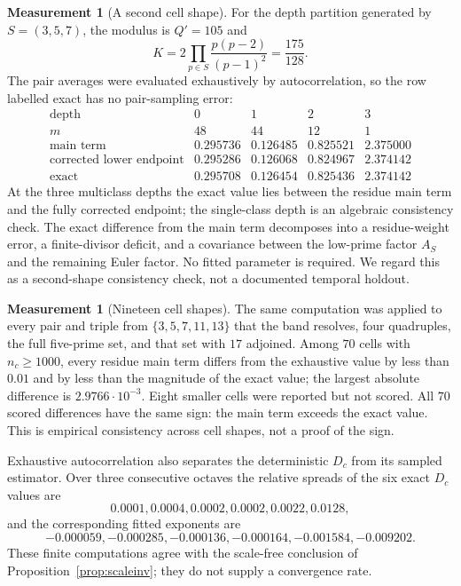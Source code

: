 \documentclass[11pt,a4paper]{article}
\theoremstyle{plain}
\theoremstyle{definition}
\newtheorem{measurement}[theorem]{Measurement}
\theoremstyle{remark}
\begin{document}
\begin{measurement}[A second cell shape]\label{meas:secondcell}
For the depth partition generated by $S=(3,5,7)$, the modulus is
$Q'=105$ and
\[
 K=2\prod_{p\in S}\frac{p(p-2)}{(p-1)^2}=\frac{175}{128}.
\]
The pair averages were evaluated exhaustively by autocorrelation, so the
row labelled exact has no pair-sampling error:
\[
\begin{array}{r|cccc}
 \text{depth}&0&1&2&3\\\hline
 m&48&44&12&1\\
 \text{main term}&0.295736&0.126485&0.825521&2.375000\\
 \text{corrected lower endpoint}&0.295286&0.126068&0.824967&2.374142\\
 \text{exact}&0.295708&0.126454&0.825436&2.374142
\end{array}
\]
At the three multiclass depths the exact value lies between the residue
main term and the fully corrected endpoint; the single-class depth is an
algebraic consistency check.  The exact difference from the main term
decomposes into a residue-weight error, a finite-divisor deficit, and a
covariance between the low-prime factor $A_S$ and the remaining Euler
factor.  No fitted parameter is required.  We regard this as a
second-shape consistency check, not a documented temporal holdout.
\end{measurement}

\begin{measurement}[Nineteen cell shapes]\label{meas:sweep}
The same computation was applied to every pair and triple from
$\{3,5,7,11,13\}$ that the band resolves, four quadruples, the full
five-prime set, and that set with $17$ adjoined.  Among $70$ cells with
$n_c\geq1000$, every residue main term differs from the exhaustive value
by less than $0.01$ and by less than the magnitude of the exact value;
the largest absolute difference is $2.9766\cdot10^{-3}$.  Eight smaller
cells were reported but not scored.  All $70$ scored differences have
the same sign: the main term exceeds the exact value.  This is empirical
consistency across cell shapes, not a proof of the sign.
\end{measurement}

Exhaustive autocorrelation also separates the deterministic $D_c$ from
its sampled estimator.  Over three consecutive octaves the relative
spreads of the six exact $D_c$ values are
\[
 0.0001, 0.0004, 0.0002, 0.0002, 0.0022, 0.0128,
\]
and the corresponding fitted exponents are
\[
 -0.000059, -0.000285, -0.000136, -0.000164,
 -0.001584, -0.009202.
\]
These finite computations agree with the scale-free conclusion of
Proposition~\ref{prop:scaleinv}; they do not supply a convergence rate.
\end{document}

